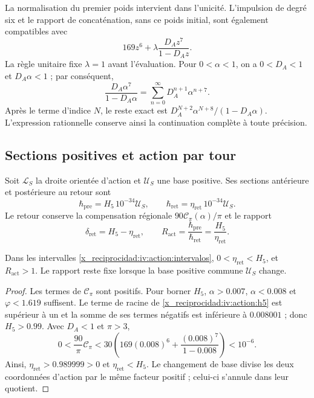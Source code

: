 La normalisation du premier poids intervient dans l’unicité.
L’impulsion de degré six et le rapport de concaténation, sans ce
poids initial, sont également compatibles avec
\[
 169z^6+\lambda\frac{D_Az^7}{1-D_Az}.
\]
La règle unitaire fixe \(\lambda=1\) avant l’évaluation.
Pour \(0<\alpha<1\), on a \(0<D_A<1\) et \(D_A\alpha<1\) ;
par conséquent,
\begin{equation}
 \frac{D_A\alpha^7}{1-D_A\alpha}
   =\sum_{n=0}^{\infty}D_A^{n+1}\alpha^{n+7}.
 \label{x_reciprocidad:iv:action:cola}
\end{equation}
Après le terme d’indice \(N\), le reste exact est
\(D_A^{N+2}\alpha^{N+8}/(1-D_A\alpha)\). L’expression rationnelle
conserve ainsi la continuation complète à toute précision.

\subsection{Sections positives et action par tour}
\label{x_reciprocidad:iv:action:secciones}

Soit \(\mathcal L_S\) la droite orientée d’action et
\(\mathcal U_S\) une base positive. Ses sections antérieure et
postérieure au retour sont
\begin{equation}
 \hbar_{\mathrm{pre}}=H_5\,10^{-34}\mathcal U_S,\qquad
 \hbar_{\mathrm{ret}}=\eta_{\mathrm{ret}}\,10^{-34}\mathcal U_S.
 \label{x_reciprocidad:iv:action:hbar}
\end{equation}
Le retour conserve la compensation régionale
\(90\mathcal C_\pi(\alpha)/\pi\) et le rapport
\begin{equation}
 \delta_{\mathrm{ret}}=H_5-\eta_{\mathrm{ret}},\qquad
 R_{\mathrm{act}}=\frac{\hbar_{\mathrm{pre}}}
                        {\hbar_{\mathrm{ret}}}
                =\frac{H_5}{\eta_{\mathrm{ret}}}.
 \label{x_reciprocidad:iv:action:razon}
\end{equation}

\begin{proposition}
\label{x_reciprocidad:iv:action:positividad}
Dans les intervalles \eqref{x_reciprocidad:iv:action:intervalos},
\(0<\eta_{\mathrm{ret}}<H_5\), et \(R_{\mathrm{act}}>1\).
Le rapport reste fixe lorsque la base positive commune
\(\mathcal U_S\) change.
\end{proposition}
\begin{proof}
Les termes de \(\mathcal C_\pi\) sont positifs. Pour borner
\(H_5\), \(\alpha>0.007\), \(\alpha<0.008\) et
\(\varphi<1.619\) suffisent. Le terme de racine de \eqref{x_reciprocidad:iv:action:h5}
est supérieur à un et la somme de ses termes négatifs est inférieure
à \(0.008001\) ; donc \(H_5>0.99\).
Avec \(D_A<1\) et \(\pi>3\),
\[
 0<\frac{90}{\pi}\mathcal C_\pi
 <30\left(169(0.008)^6+
             \frac{(0.008)^7}{1-0.008}\right)<10^{-6}.
\]
Ainsi, \(\eta_{\mathrm{ret}}>0.989999>0\) et
\(\eta_{\mathrm{ret}}<H_5\). Le changement de base divise les deux
coordonnées d’action par le même facteur positif ; celui-ci
s’annule dans leur quotient.
\end{proof}

